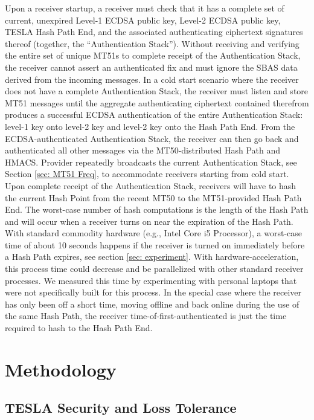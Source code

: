 \documentclass[letterpaper,times]{IONconf/IONconf}
\begin{document}
Upon a receiver startup, a receiver must check that it has a complete set of current, unexpired Level-1 ECDSA public key, Level-2 ECDSA public key, TESLA Hash Path End, and the associated authenticating ciphertext signatures thereof (together, the ``Authentication Stack'').
Without receiving and verifying the entire set of unique MT51s to complete receipt of the Authentication Stack, the receiver cannot assert an authenticated fix and must ignore the SBAS data derived from the incoming messages.
In a cold start scenario where the receiver does not have a complete Authentication Stack, the receiver must listen and store MT51 messages until the aggregate authenticating ciphertext contained therefrom produces a successful ECDSA authentication of the entire Authentication Stack: level-1 key onto level-2 key and level-2 key onto the Hash Path End.
From the ECDSA-authenticated Authentication Stack, the receiver can then go back and authenticated all other messages via the MT50-distributed Hash Path and HMACS.
Provider repeatedly broadcasts the current Authentication Stack, see Section \ref{sec: MT51 Freq}, to accommodate receivers starting from cold start.
Upon complete receipt of the Authentication Stack, receivers will have to hash the current Hash Point from the recent MT50 to the MT51-provided Hash Path End.
The worst-case number of hash computations is the length of the Hash Path and will occur when a receiver turns on near the expiration of the Hash Path.
With standard commodity hardware (e.g., Intel Core i5 Processor), a worst-case time of about 10 seconds happens if the receiver is turned on immediately before a Hash Path expires, see section \ref{sec: experiment}.
With hardware-acceleration, this process time could decrease and be parallelized with other standard receiver processes.
We measured this time by experimenting with personal laptops that were not specifically built for this process.
In the special case where the receiver has only been off a short time, moving offline and back online during the use of the same Hash Path, the receiver time-of-first-authenticated is just the time required to hash to the Hash Path End.

\section{Methodology} \label{sec: methodology}

\subsection{TESLA Security and Loss Tolerance}
\end{document}
